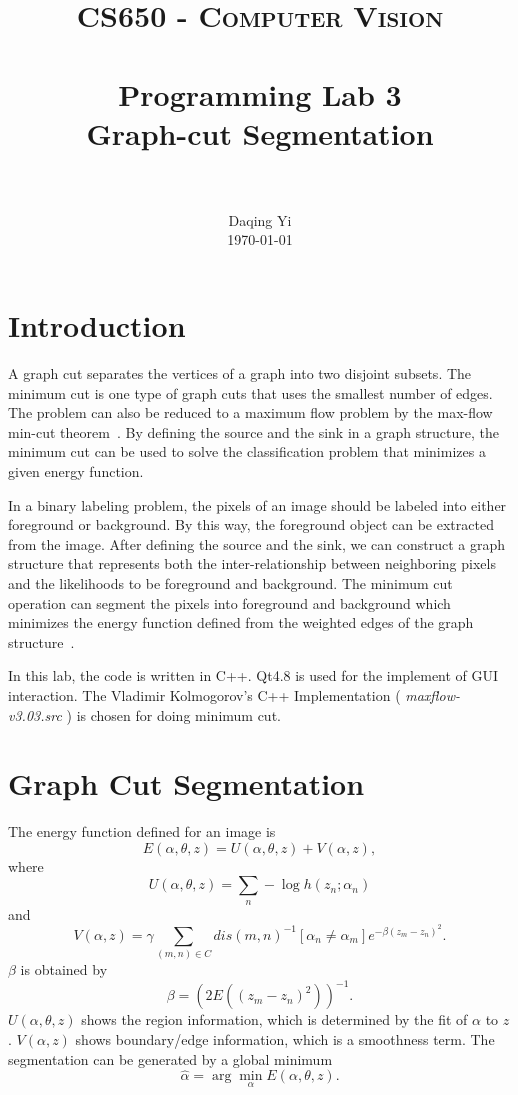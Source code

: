 \documentclass[paper=a4, fontsize=11pt]{scrartcl}
\title{
		\usefont{OT1}{bch}{b}{n}
		\normalfont \normalsize \textsc{CS650 - Computer Vision} \\ [25pt]
		\horrule{0.5pt} \\[0.4cm]
		\huge Programming Lab 3 \\ Graph-cut Segmentation \\
		\horrule{2pt} \\[0.5cm]
}
\author{
		\normalfont 								\normalsize
        Daqing Yi\\[-3pt]		\normalsize
        \today
}
\date{}
\begin{document}
\maketitle

\section{Introduction}

A graph cut separates the vertices of a graph into two disjoint subsets.
The minimum cut is one type of graph cuts that uses the smallest number of edges.
The problem can also be reduced to a maximum flow problem by the max-flow min-cut theorem~\cite{wiki:Max-flow_min-cut_theorem}.
By defining the source and the sink in a graph structure, the minimum cut can be used to solve the classification problem that minimizes a given energy function.

In a binary labeling problem, the pixels of an image should be labeled into either foreground or background.
By this way, the foreground object can be extracted from the image.
After defining the source and the sink, we can construct a graph structure that represents both the inter-relationship between neighboring pixels and the likelihoods to be foreground and background.
The minimum cut operation can segment the pixels into foreground and background which minimizes the energy function defined from the weighted edges of the graph structure~\cite{937505}.

In this lab, the code is written in C++.
Qt4.8 is used for the implement of GUI interaction.
The Vladimir Kolmogorov's C++ Implementation ( \emph{ maxflow-v3.03.src } ) is chosen for doing minimum cut.

\section{Graph Cut Segmentation}

The energy function defined for an image is~\cite{rother2004grabcut} 
\begin{equation}
\label{eq:gibbs_energy}
E(\alpha, \theta, z) = U( \alpha, \theta, z ) + V(\alpha, z),
\end{equation} 
where
\begin{equation}
\label{eq:region_energy}
U( \alpha, \theta, z ) = \sum_{n} - \log h( z_{n} ; \alpha_{n} )
\end{equation}
and
\begin{equation}
\label{eq:boundary_energy}
V(\alpha, z) = \gamma \sum_{ (m, n) \in C } dis(m, n)^{-1} [\alpha_{n} \neq \alpha_{m} ] e^{ - \beta (z_{m} - z_{n})^{2} }.
\end{equation}
$ \beta $ is obtained by 
\begin{equation}
\beta = (2 E( (z_{m} - z_{n})^{2} ) )^{-1}.
\end{equation} 
$ U( \alpha, \theta, z ) $ shows the region information, which is determined by the fit of $ \alpha $ to $ z $.
$ V(\alpha, z) $ shows boundary/edge information, which is a smoothness term.
The segmentation can be generated by a global minimum
\begin{equation}
\hat{ \alpha } = \arg \min_{\alpha} E(\alpha, \theta, z).
\end{equation}
\end{document}
